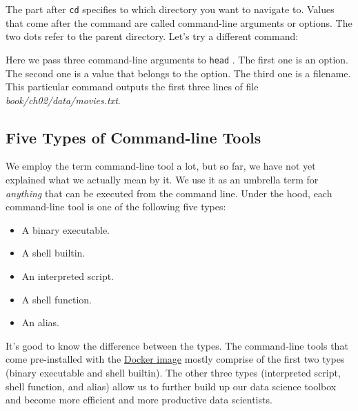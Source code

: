 \documentclass[
]{book}
\newenvironment{Shaded}{\begin{snugshade}}{\end{snugshade}}
\newcommand{\ExtensionTok}[1]{#1}
\newcommand{\FunctionTok}[1]{\textcolor[rgb]{0.00,0.00,0.00}{#1}}
\newcommand{\NormalTok}[1]{#1}
\providecommand{\tightlist}{%
  \setlength{\itemsep}{0pt}\setlength{\parskip}{0pt}}
\theoremstyle{definition}
\theoremstyle{definition}
\theoremstyle{definition}
\theoremstyle{remark}
\begin{document}
The part after \texttt{cd} specifies to which directory you want to navigate to. Values that come after the command are called command-line arguments or options. The two dots refer to the parent directory. Let's try a different command:

\begin{Shaded}
\end{Shaded}

Here we pass three command-line arguments to \texttt{head} \citep{head}. The first one is an option. The second one is a value that belongs to the option. The third one is a filename. This particular command outputs the first three lines of file \emph{book/ch02/data/movies.txt}.

\hypertarget{five-types-of-command-line-tools}{%
\subsection{Five Types of Command-line Tools}\label{five-types-of-command-line-tools}}

We employ the term command-line tool a lot, but so far, we have not yet explained what we actually mean by it. We use it as an umbrella term for \emph{anything} that can be executed from the command line. Under the hood, each command-line tool is one of the following five types:

\begin{itemize}
\tightlist
\item
  A binary executable.
\item
  A shell builtin.
\item
  An interpreted script.
\item
  A shell function.
\item
  An alias.
\end{itemize}

It's good to know the difference between the types. The command-line tools that come pre-installed with the \protect\hyperlink{docker-image}{Docker image} mostly comprise of the first two types (binary executable and shell builtin). The other three types (interpreted script, shell function, and alias) allow us to further build up our data science toolbox and become more efficient and more productive data scientists.
\end{document}
